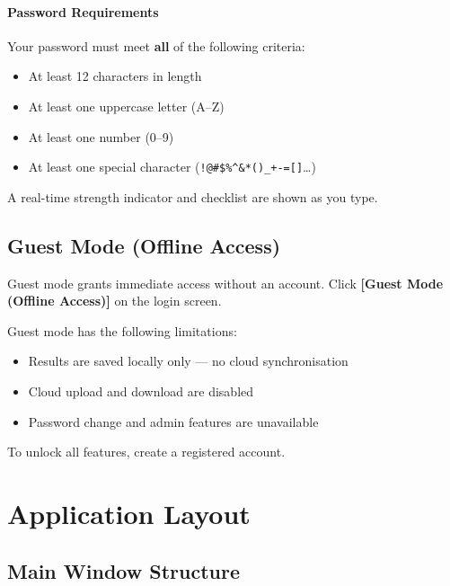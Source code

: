 \documentclass[12pt,a4paper]{report}
\newcommand{\btn}[1]{\textbf{\textcolor{primary}{[#1]}}}
\begin{document}
\subsubsection{Password Requirements}

Your password must meet \textbf{all} of the following criteria:

\begin{itemize}[leftmargin=1.5em]
  \item[\faCheck] At least 12 characters in length
  \item[\faCheck] At least one uppercase letter (A--Z)
  \item[\faCheck] At least one number (0--9)
  \item[\faCheck] At least one special character (\texttt{!@\#\$\%\^{}\&*()\_+-=[]}\ldots)
\end{itemize}

A real-time strength indicator and checklist are shown as you type.

\section{Guest Mode (Offline Access)}

Guest mode grants immediate access without an account. Click \btn{Guest Mode (Offline Access)} on the login screen.

\begin{warningbox}
  Guest mode has the following limitations:
  \begin{itemize}[leftmargin=1em]
    \item Results are saved locally only — no cloud synchronisation
    \item Cloud upload and download are disabled
    \item Password change and admin features are unavailable
  \end{itemize}
  To unlock all features, create a registered account.
\end{warningbox}

\chapter{Application Layout}

\section{Main Window Structure}
\end{document}
